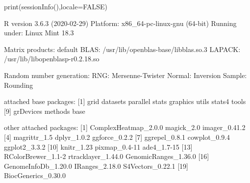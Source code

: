 \documentclass[a4paper,10pt]{article}
\begin{document}
\begin{Schunk}
\begin{Sinput}
  print(sessionInfo(),locale=FALSE)
\end{Sinput}
\begin{Soutput}
R version 3.6.3 (2020-02-29)
Platform: x86_64-pc-linux-gnu (64-bit)
Running under: Linux Mint 18.3

Matrix products: default
BLAS:   /usr/lib/openblas-base/libblas.so.3
LAPACK: /usr/lib/libopenblasp-r0.2.18.so

Random number generation:
 RNG:     Mersenne-Twister 
 Normal:  Inversion 
 Sample:  Rounding 
 
attached base packages:
 [1] grid      datasets  parallel  stats     graphics  utils     stats4    tools    
 [9] grDevices methods   base     

other attached packages:
 [1] ComplexHeatmap_2.0.0 magick_2.0           imager_0.41.2       
 [4] magrittr_1.5         dplyr_1.0.2          ggforce_0.2.2       
 [7] ggrepel_0.8.1        cowplot_0.9.4        ggplot2_3.3.2       
[10] knitr_1.23           pixmap_0.4-11        ade4_1.7-15         
[13] RColorBrewer_1.1-2   rtracklayer_1.44.0   GenomicRanges_1.36.0
[16] GenomeInfoDb_1.20.0  IRanges_2.18.0       S4Vectors_0.22.1    
[19] BiocGenerics_0.30.0 


\end{Soutput}
\end{Schunk}
\end{document}

